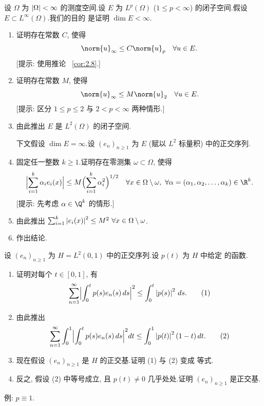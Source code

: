 \begin{exercise}
\label{exer:5.29}
设 $\Omega$ 为 $\left|\Omega\right|<\infty$ 的测度空间.设 $E$ 为 $L^p(\Omega)$
($1\le p<\infty$) 的闭子空间.假设 $E\subset L^\infty(\Omega)$.我们的目的
是证明 $\dim E<\infty$.
\begin{enumerate}[label=\arabic*., leftmargin=2.2em, itemsep=0.3em]
	\item 证明存在常数 $C$, 使得
	      \begin{equation*}
	      \norm{u}_\infty\le C\norm{u}_p\quad\forall u\in E.
	      \end{equation*}
	      [提示: 使用推论~
\ref{cor:2.8}.]
	\item 证明存在常数 $M$, 使得
	      \begin{equation*}
	      \norm{u}_\infty\le M\norm{u}_2\quad\forall u\in E.
	      \end{equation*}
	      [提示: 区分 $1\le p\le2$ 与 $2<p<\infty$ 两种情形.]
	\item 由此推出 $E$ 是 $L^2(\Omega)$ 的闭子空间.

	      下文假设 $\dim E=\infty$.设 $(e_n)_{n\ge1}$ 为 $E$ (赋以 $L^2$
	      标量积) 中的正交序列.
	\item 固定任一整数 $k\ge1$.证明存在零测集 $\omega\subset\Omega$, 使得
	      \begin{equation*}
	      \Bigl|\sum_{i=1}^k\alpha_ie_i(x)\Bigr|
	      \le M\Bigl(\sum_{i=1}^k\alpha_i^2\Bigr)^{1/2}
	      \quad\forall x\in\Omega\setminus\omega,\
	      \forall\alpha=(\alpha_1,\alpha_2,\dots,\alpha_k)\in\R^k.
	      \end{equation*}
	      [提示: 先考虑 $\alpha\in\Q^k$ 的情形.]
	\item 由此推出 $\sum_{i=1}^k\left|e_i(x)\right|^2\le M^2
	      \ \forall x\in\Omega\setminus\omega$.
	\item 作出结论.
\end{enumerate}
\end{exercise}

\begin{exercise}
\label{exer:5.30}
设 $(e_n)_{n\ge1}$ 为 $H=L^2(0,1)$ 中的正交序列.设 $p(t)$ 为 $H$ 中给定
的函数.
\begin{enumerate}[label=\arabic*., leftmargin=2.2em, itemsep=0.3em]
	\item 证明对每个 $t\in[0,1]$, 有
	      \begin{equation}
	      \sum_{n=1}^\infty\Bigl|\int_0^tp(s)e_n(s)\,ds\Bigr|^2
	      \le\int_0^t\left|p(s)\right|^2\,ds.
	      \tag{1}
	      \end{equation}
	\item 由此推出
	      \begin{equation}
	      \sum_{n=1}^\infty\int_0^1\Bigl|\int_0^tp(s)e_n(s)\,ds\Bigr|^2dt
	      \le\int_0^1\left|p(t)\right|^2(1-t)\,dt.
	      \tag{2}
	      \end{equation}
	\item 现在假设 $(e_n)_{n\ge1}$ 是 $H$ 的正交基.证明 (1) 与 (2) 变成
	      等式.
	\item 反之, 假设 (2) 中等号成立, 且 $p(t)\ne0$ 几乎处处.证明
	      $(e_n)_{n\ge1}$ 是正交基.
\end{enumerate}
例: $p\equiv1$.
\end{exercise}

